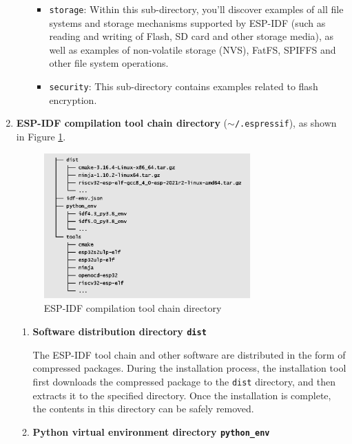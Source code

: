 \documentclass[a4paper,12pt,openany]{book}
\begin{document}
\begin{enumerate}[label=(\arabic*),leftmargin=2em]
\begin{enumerate}[label=\textbf{\alph*.},leftmargin=0em]
\begin{itemize}[leftmargin=1em]
            \item \verb|storage|: Within this sub-directory, you’ll discover examples of all file systems and storage mechanisms supported by ESP-IDF (such as reading and writing of Flash, SD card and other storage media), as well as examples of non-volatile storage (NVS), FatFS, SPIFFS and other file system operations.
            \item \verb|security|: This sub-directory contains examples related to flash encryption.
        \end{itemize}
    \end{enumerate}

    \item \textbf{ESP-IDF compilation tool chain directory} (\texttt{$\sim$/.espressif}), as shown in Figure \ref{ESP-IDF compilation tool chain directory}.

    \begin{figure}[h!]
        \centering
        \includegraphics[width=0.75\textwidth]{D4Z/4-3}
        \caption{ESP-IDF compilation tool chain directory}
        \label{ESP-IDF compilation tool chain directory}
    \end{figure}

    \begin{enumerate}[label=\textbf{\alph*.},leftmargin=0em]
        \item \textbf{Software distribution directory \texttt{dist}}

        The ESP-IDF tool chain and other software are distributed in the form of compressed packages. During the installation process, the installation tool first downloads the compressed package to the \verb|dist| directory, and then extracts it to the specified directory. Once the installation is complete, the contents in this directory can be safely removed.

        \item \textbf{Python virtual environment directory \texttt{python\_env}}


\end{enumerate}
\end{enumerate}
\end{document}
